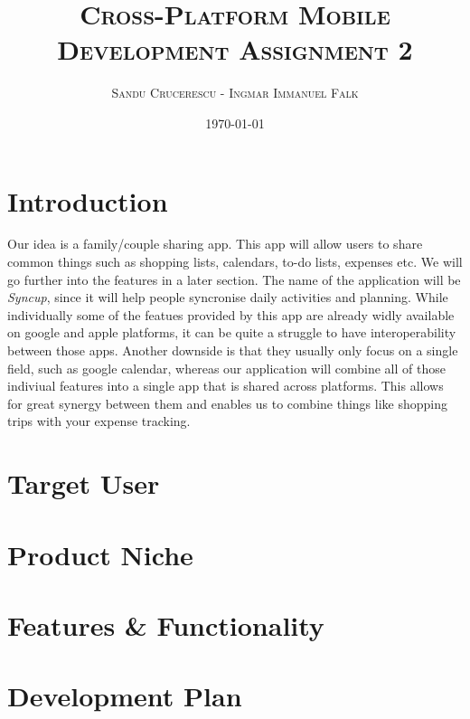 \documentclass[12pt]{article}
\begin{document}
\title{\textsc{Cross-Platform Mobile Development \linebreak  \large{Assignment 2} }}
\author{\textsc{Sandu Crucerescu - Ingmar Immanuel Falk}}
\date{\textsc{\today}}

\maketitle
\pagebreak

\tableofcontents
\pagebreak

\section{Introduction}

Our idea is a family/couple sharing app. This app will allow users to share common things
such as shopping lists, calendars, to-do lists, expenses etc. We will go further into the features
in a later section. The name of the application will be \emph{Syncup}, since it will help people
syncronise daily activities and planning. While individually some of the featues provided by this
app are already widly available on google and apple platforms, it can be quite a struggle to
have interoperability between those apps. Another downside is that they usually only focus on a 
single field, such as google calendar, whereas our application will combine all of those indiviual features
into a single app that is shared across platforms. This allows for great synergy between them and enables us
to combine things like shopping trips with your expense tracking.

\section{Target User}

\section{Product Niche}

\section{Features \& Functionality}

\section{Development Plan}
\end{document}
